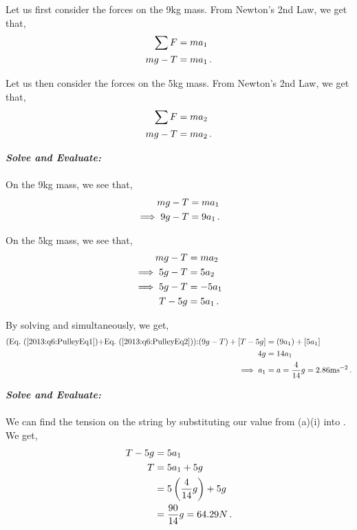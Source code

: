 \begin{subquestions}
\begin{subsubquestions}
Let us first consider the forces on the 9kg mass. From Newton's 2nd Law, we get that,
\begin{align}
	\sum F & = ma_1 \nonumber \\
	mg - T & = ma_1 \,.
\end{align}

Let us then consider the forces on the 5kg mass. From Newton's 2nd Law, we get that,
\begin{align}
	\sum F & = ma_2 \nonumber \\
	mg-T & = ma_2 \,.
\end{align}




\textbf{\textit{Solve and Evaluate:}} \\ \\
On the 9kg mass, we see that,
\begin{align}
	mg - T & = ma_1 \nonumber \\
	\implies 9g-T & = 9a_1 \,. \label{2013:q6:PulleyEq1}
\end{align}

On the 5kg mass, we see that,
\begin{align}
	mg - T & = ma_2 \nonumber \\
	\implies 5g-T & = 5a_2 \nonumber \\
	\implies 5g-T & = -5a_1 \nonumber \\
	T-5g & = 5a_1 \,. \label{2013:q6:PulleyEq2}
\end{align}

By solving  and  simultaneously, we get,
\begin{align}
	\text{(\req{2013:q6:PulleyEq1}+\req{2013:q6:PulleyEq2}):} (9g-T)+[T-5g] & = (9a_1)+[5a_1] \nn \\
	4g & = 14a_1 \nn \\
	\implies a_1 & = a = \frac{4}{14}g = 2.86\text{ms}^{-2} \,.
\end{align}


\subsubquestion

\textbf{\textit{Solve and Evaluate:}} \\ \\
We can find the tension on the string by substituting our value from (a)(i) into . We get,
\begin{align}
	T-5g & = 5a_1 \nonumber \\
	T & = 5a_1 + 5g \nonumber \\
	  & = 5\left(\frac{4}{14}g \right) + 5g \nonumber \\
	  & = \frac{90}{14}g = 64.29N \,.
\end{align}


\end{subsubquestions}
\end{subquestions}
